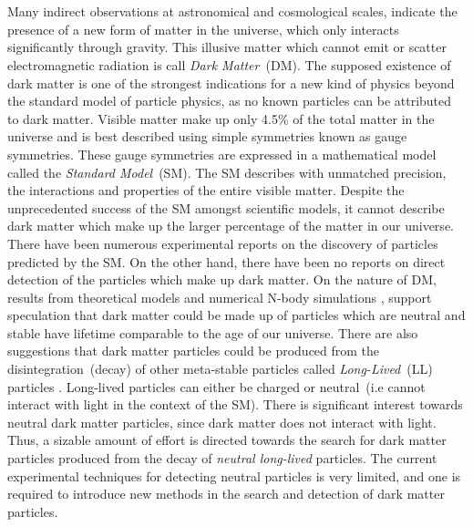 \paragraph*{} \mbox{}\\
Many indirect observations at astronomical and cosmological scales\cite{DM}, indicate the presence of a new form of matter in the universe, which
only interacts significantly through gravity. This illusive matter which cannot emit or scatter electromagnetic radiation is call \textit{Dark Matter}~(DM).
The supposed existence of dark matter is one of the strongest indications for a new kind of physics beyond the standard model of particle physics, as no known particles can be attributed to dark matter. Visible matter make up only 4.5\% of the total matter in the universe and is best described using simple symmetries known as gauge symmetries. These gauge symmetries are expressed in a mathematical model called the \textit{Standard Model}~(SM). The SM describes with unmatched precision, the interactions and properties of the entire visible matter.  Despite the unprecedented success of the SM amongst scientific models, it cannot describe dark matter which make up the larger percentage of the matter in our universe. There have been numerous experimental reports on the discovery of particles predicted by the SM. On the other hand, there have been no reports on direct detection of the particles which make up dark matter. On the nature of DM, results from theoretical models and numerical N-body simulations \cite{DMS}, support speculation that dark matter could be made up of particles which are neutral and stable \ie have lifetime comparable to the age of our universe. There are also suggestions that dark matter particles could be produced from the disintegration~(decay) of other meta-stable particles called \textit{Long-Lived}~(LL) particles \cite{SUSYDM}. Long-lived particles can either be charged or neutral~(i.e cannot interact with light in the context of the SM). There is significant interest towards neutral dark matter particles,  since dark matter does not interact with light. Thus, a sizable amount of effort is directed towards the search for dark matter particles produced from the decay of \textit{neutral long-lived} particles\cite{LSPDM}. The current experimental techniques for detecting neutral particles is very limited, and one is required to introduce new methods in the search and detection of dark matter particles.  %
